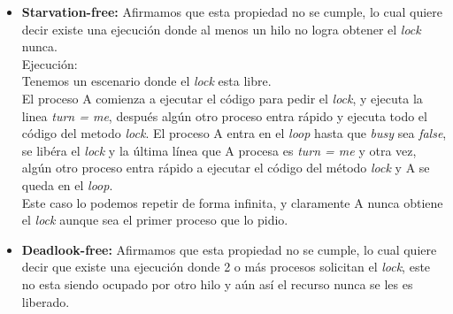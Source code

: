 \documentclass{article}
\begin{document}
\begin{enumerate}
{\begin{itemize}
{            Demostración (por contradicción):\\
            Supongamos que 2 o más procesos adquieren el \textit{lock}
            antes de que este se libere.\\

            Si dos o más procesos adquirieron el \textit{lock} eso
            quiere decir que en algún momento ellos procesaron 
            \textit{turn != me} como \textit{false} y por lo tanto
            tuvieron que procesar \textit{while(busy)} como
            \textit{false}.\\
            Pero para que eso pase, cada proceso que obtuvo el
            \textit{lock} ejecuto \textit{turn = me}, por lo que el
            último que lo escribio fue el único que vio \textit{turn
              != me} como \textit{false}, lo cual es una contradicción
            por que todos vieron \textit{turn != me} como
            \textit{false}, por lo tanto la exclusión mutua se cumple.\\
          }

        \item{\textbf{Starvation-free:} Afirmamos que esta propiedad
            no se cumple, lo cual quiere decir existe una ejecución
            donde al menos un hilo no logra obtener el \textit{lock}
            nunca.\\

            Ejecución:\\
            Tenemos un escenario donde el \textit{lock} esta libre.\\
            El proceso A comienza a ejecutar el código para pedir el
            \textit{lock}, y ejecuta la linea \textit{turn =
              me}, después algún otro proceso entra rápido y ejecuta
            todo el código del metodo \textit{lock}. El proceso A
            entra en el \textit{loop} hasta que \textit{busy} sea
            \textit{false}, se libéra el \textit{lock} y la última
            línea que A procesa es \textit{turn = me} y otra vez,
            algún otro proceso entra rápido a ejecutar el código del
            método \textit{lock} y A se queda en el \textit{loop}.\\
            Este caso lo podemos repetir de forma infinita, y
            claramente A nunca obtiene el \textit{lock} aunque sea el
            primer proceso que lo pidio.\\

          }

          \item{\textbf{Deadlook-free:} Afirmamos que esta propiedad
              no se cumple, lo cual quiere decir que existe una
              ejecución donde 2 o más procesos solicitan el
              \textit{lock}, este no esta siendo ocupado por otro hilo
              y aún así el recurso nunca se les es liberado.\\

}
\end{itemize}}
\end{enumerate}
\end{document}
